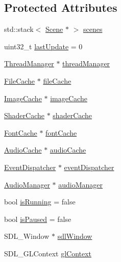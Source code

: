 \subsection*{Protected Attributes}
\begin{DoxyCompactItemize}
\item 
std\+::stack$<$ \mbox{\hyperlink{classsage_1_1Scene}{Scene}} $\ast$ $>$ \mbox{\hyperlink{classsage_1_1Application_a684050e1d1b3033c9226c2a3481f934d}{scenes}}
\item 
uint32\+\_\+t \mbox{\hyperlink{classsage_1_1Application_a08facf4df89e707b2a07a1be0782643a}{last\+Update}} = 0
\item 
\mbox{\hyperlink{classsage_1_1ThreadManager}{Thread\+Manager}} $\ast$ \mbox{\hyperlink{classsage_1_1Application_a246cb87d276d2ee0ca471379307bc456}{thread\+Manager}}
\item 
\mbox{\hyperlink{classsage_1_1FileCache}{File\+Cache}} $\ast$ \mbox{\hyperlink{classsage_1_1Application_ab576f71a5b927d4b7f7790ae0b15c213}{file\+Cache}}
\item 
\mbox{\hyperlink{classsage_1_1ImageCache}{Image\+Cache}} $\ast$ \mbox{\hyperlink{classsage_1_1Application_ab335f3e9f82d3648878128a75caeb89b}{image\+Cache}}
\item 
\mbox{\hyperlink{classsage_1_1ShaderCache}{Shader\+Cache}} $\ast$ \mbox{\hyperlink{classsage_1_1Application_adc39fae2de148d3c726b86d0c93a4816}{shader\+Cache}}
\item 
\mbox{\hyperlink{classsage_1_1FontCache}{Font\+Cache}} $\ast$ \mbox{\hyperlink{classsage_1_1Application_a998309542a632e444d9a7d9ef6e5d5bf}{font\+Cache}}
\item 
\mbox{\hyperlink{classsage_1_1AudioCache}{Audio\+Cache}} $\ast$ \mbox{\hyperlink{classsage_1_1Application_a38828d2324d2b6a9feae40049eee2aa7}{audio\+Cache}}
\item 
\mbox{\hyperlink{classsage_1_1EventDispatcher}{Event\+Dispatcher}} $\ast$ \mbox{\hyperlink{classsage_1_1Application_af44decd857e2843750a781ec141163f0}{event\+Dispatcher}}
\item 
\mbox{\hyperlink{classsage_1_1AudioManager}{Audio\+Manager}} $\ast$ \mbox{\hyperlink{classsage_1_1Application_aa5d509f796f7d2d9a779fc01143c3a75}{audio\+Manager}}
\item 
bool \mbox{\hyperlink{classsage_1_1Application_aa5197cd07379bdbc371c26c21f936c17}{is\+Running}} = false
\item 
bool \mbox{\hyperlink{classsage_1_1Application_a2c8135f73ec3091ffcb750dcc280c4d2}{is\+Paused}} = false
\item 
S\+D\+L\+\_\+\+Window $\ast$ \mbox{\hyperlink{classsage_1_1Application_ab8d3166ecc1b2c3387da0633557f0d77}{sdl\+Window}}
\item 
S\+D\+L\+\_\+\+G\+L\+Context \mbox{\hyperlink{classsage_1_1Application_af4b3656acba3ea7f6409885223e49dc2}{gl\+Context}}
\end{DoxyCompactItemize}


